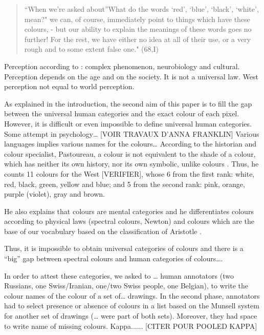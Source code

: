 \documentclass[11pt,a4paper]{article}
\begin{document}
\begin{quote}
	``When we're asked about''What do the words `red', `blue', `black',
	`white', mean?" we can, of course, immediately point to things which
	have these colours, - but our ability to explain the meanings of these
	words goes no further! For the rest, we have either no idea at all of
	their use, or a very rough and to some extent false one." (68,I)
\end{quote}

Perception according to
\cite[][p. 35 and p.87]{pastoureau2017}: complex phenomenon,
neurobiology and cultural. Perception depends on the age and on the
society. It is not a universal law. West perception not equal to world
perception.


As explained in the
introduction, the second aim of this paper is to fill the gap between
the universal human categories and the exact colour of each pixel.
However, it is difficult or even impossible to define universal human
categories. Some attempt in psychology\ldots{} {[}VOIR TRAVAUX D'ANNA
FRANKLIN{]} Various languages implies various names for the
colours\ldots{} According to the historian and colour specialist,
Pastoureau, a colour is not equivalent to the shade of a colour, which
has neither its own history, nor its own symbolic, unlike colours
\cite[][p. 12 and p. 63]{pastoureau2017}. Thus, he counts 11 colours for
the West {[}VERIFIER{]}, whose 6 from the first rank: white, red, black, green, yellow and blue; and 5 from the second rank: pink, orange, purple (violet), gray and brown.

He also explains that colours are mental categories
\cite[][p. 36]{pastoureau2017} and he differentiates colours according
to physical laws (spectral colours, Newton) and colours which are the
base of our vocabulary based on the classification of Aristotle
\cite[][p. 90-91]{pastoureau2017}.

Thus, it is impossible to obtain universal categories of colours and
there is a ``big'' gap between spectral colours and human categories of
colours\ldots{}.

In order to attest these categories, we asked to
\ldots{} human annotators (two Russians, one Swiss/Iranian, one/two
Swiss people, one Belgian), to write the colour names of the colour of a
set of\ldots{} drawings. In the second phase, annotators had to select
presence or absence of colours in a list based on the Munsell system for
another set of drawings (\ldots{} were part of both sets). Moreover,
they had space to write name of missing colours.
Kappa...... [CITER POUR POOLED KAPPA]
\end{document}
